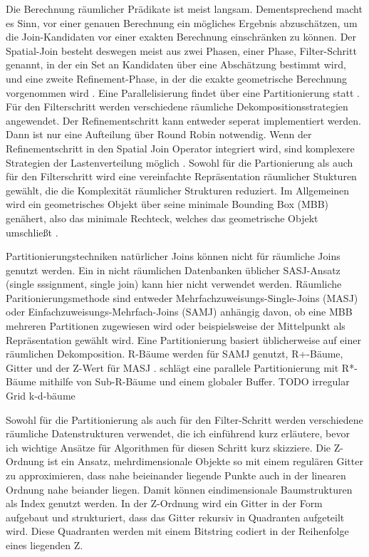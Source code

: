 \documentclass[a4paper,12pt,twoside]{article}
\begin{document}
Die Berechnung räumlicher Prädikate ist meist langsam. Dementsprechend macht es Sinn, vor einer genauen Berechnung ein mögliches Ergebnis abzuschätzen, um die Join-Kandidaten vor einer exakten Berechnung einschränken zu können. Der Spatial-Join besteht deswegen meist aus zwei Phasen, einer Phase, Filter-Schritt genannt, in der ein Set an Kandidaten über eine Abschätzung bestimmt wird, und eine zweite Refinement-Phase, in der die exakte geometrische Berechnung vorgenommen wird {\autocite[S. 309f]{Rigaux2001}}. Eine Parallelisierung findet über eine Partitionierung statt {\autocite{Zhou1998}}. Für den Filterschritt werden verschiedene räumliche Dekompositionsstrategien angewendet. Der Refinementschritt kann entweder seperat implementiert werden. Dann ist nur eine Aufteilung über Round Robin notwendig. Wenn der Refinementschritt in den Spatial Join Operator integriert wird, sind komplexere Strategien der Lastenverteilung möglich {\autocite{Brinkhoff1996}}. Sowohl für die Partionierung als auch für den Filterschritt wird eine vereinfachte Repräsentation räumlicher Stukturen gewählt, die die Komplexität räumlicher Strukturen reduziert. Im Allgemeinen wird ein geometrisches Objekt über seine minimale Bounding Box (MBB) genähert, also das minimale Rechteck, welches das geometrische Objekt umschließt {\autocite[S. 202f]{Rigaux2001}}.

Partitionierungstechniken natürlicher Joins können nicht für räumliche Joins genutzt werden. Ein in nicht räumlichen Datenbanken üblicher SASJ-Ansatz (single sssignment, single join) kann hier nicht verwendet werden. Räumliche Paritionierungsmethode sind entweder Mehrfachzuweisungs-Single-Joins (MASJ) oder Einfachzuweisungs-Mehrfach-Joins (SAMJ) anhängig davon, ob eine MBB mehreren Partitionen zugewiesen wird oder beispielsweise der Mittelpunkt als Repräsentation gewählt wird. Eine Partitionierung basiert üblicherweise auf einer räumlichen Dekomposition. R-Bäume werden für SAMJ genutzt, R+-Bäume, Gitter und der Z-Wert für MASJ {\autocite{Zhou1998}}. {\textcite{Brinkhoff1996}} schlägt eine parallele Partitionierung mit R*-Bäume mithilfe von Sub-R-Bäume und einem globaler Buffer. TODO irregular Grid k-d-bäume

Sowohl für die Partitionierung als auch für den Filter-Schritt werden verschiedene räumliche Datenstrukturen verwendet, die ich einführend kurz erläutere, bevor ich wichtige Ansätze für Algorithmen für diesen Schritt kurz skizziere. Die Z-Ordnung ist ein Ansatz, mehrdimensionale Objekte so mit einem regulären Gitter zu approximieren, dass nahe beieinander liegende Punkte auch in der linearen Ordnung nahe beiander liegen. Damit können eindimensionale Baumstrukturen als Index genutzt werden. In der Z-Ordnung wird ein Gitter in der Form aufgebaut und strukturiert, dass das Gitter rekursiv in Quadranten aufgeteilt wird. Diese Quadranten werden mit einem Bitstring codiert in der Reihenfolge eines liegenden Z.
\end{document}
